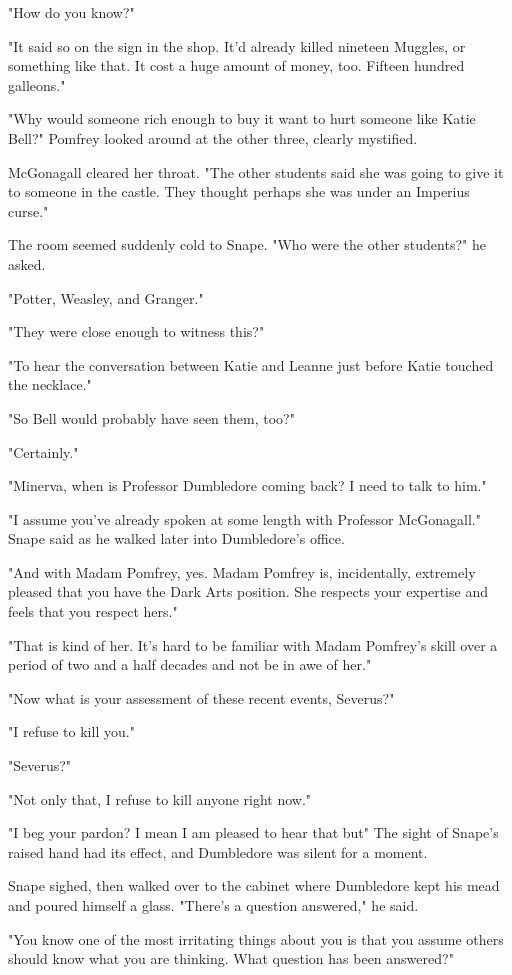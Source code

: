 "How do you know?"

"It said so on the sign in the shop. It'd already killed nineteen Muggles, or something like that. It cost a huge amount of money, too. Fifteen hundred galleons."

"Why would someone rich enough to buy it want to hurt someone like Katie Bell?" Pomfrey looked around at the other three, clearly mystified.

McGonagall cleared her throat. "The other students said she was going to give it to someone in the castle. They thought perhaps she was under an Imperius curse."

The room seemed suddenly cold to Snape. "Who were the other students?" he asked.

"Potter, Weasley, and Granger."

"They were close enough to witness this?"

"To hear the conversation between Katie and Leanne just before Katie touched the necklace."

"So Bell would probably have seen them, too?"

"Certainly."

"Minerva, when is Professor Dumbledore coming back? I need to talk to him."

"I assume you've already spoken at some length with Professor McGonagall." Snape said as he walked later into Dumbledore's office.

"And with Madam Pomfrey, yes. Madam Pomfrey is, incidentally, extremely pleased that you have the Dark Arts position. She respects your expertise and feels that you respect hers."

"That is kind of her. It's hard to be familiar with Madam Pomfrey's skill over a period of two and a half decades and not be in awe of her."

"Now what is your assessment of these recent events, Severus?"

"I refuse to kill you."

"Severus?"

"Not only that, I refuse to kill anyone right now."

"I beg your pardon? I mean I am pleased to hear that but{\el}" The sight of Snape's raised hand had its effect, and Dumbledore was silent for a moment.

Snape sighed, then walked over to the cabinet where Dumbledore kept his mead and poured himself a glass. "There's a question answered," he said.

"You know one of the most irritating things about you is that you assume others should know what you are thinking. What question has been answered?"

